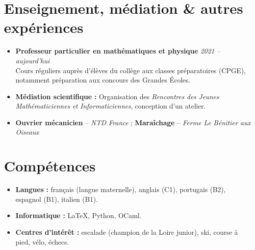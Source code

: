 \documentclass[11pt,a4paper]{article}
\begin{document}
	\section*{Enseignement, médiation \& autres expériences}
	\begin{itemize}[leftmargin=1em, label={}]
		\item \textbf{Professeur particulier en mathématiques et physique} \hfill \textit{2021 -- aujourd'hui} \\
		Cours réguliers auprès d'élèves du collège aux classes préparatoires (CPGE), notamment préparation aux concours des Grandes Écoles.
		\vspace{0.02cm}

		\item \textbf{Médiation scientifique :} Organisation des \emph{Rencontres des Jeunes Mathématiciennes et Informaticiennes}, conception d'un atelier.
		\vspace{0.02cm}

		\item \textbf{Ouvrier mécanicien} -- \textit{NTD France} ; \textbf{Maraîchage} -- \textit{Ferme Le Bénitier aux Oiseaux}
	\end{itemize}

	\section*{Compétences}
	\begin{itemize}[leftmargin=1.5em, label=\textbullet, itemsep=2pt]
		\item \textbf{Langues :} français (langue maternelle), anglais (C1), portugais (B2), espagnol (B1), italien (B1).
		\item \textbf{Informatique :} \LaTeX, Python, OCaml.
		\item \textbf{Centres d'intérêt :} escalade (champion de la Loire junior), ski, course à pied, vélo, échecs.
	\end{itemize}
\end{document}
